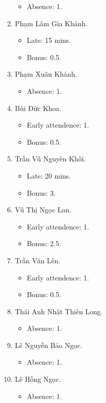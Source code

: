\documentclass{article}
\begin{document}
\begin{enumerate}
	\begin{itemize}
		\item Absence: 1.
	\end{itemize}
	\item {\sc Phạm Lâm Gia Khánh.}
	\begin{itemize}
		\item Late: 15 mins.
		\item Bonus: 0.5.
	\end{itemize}
	\item {\sc Phạm Xuân Khánh.}
	\begin{itemize}
		\item Absence: 1.
	\end{itemize}
	\item {\sc Bùi Đức Khoa.}
	\begin{itemize}
		\item Early attendence: 1.
		\item Bonus: 0.5.
	\end{itemize}
	\item {\sc Trần Vũ Nguyên Khôi.}
	\begin{itemize}
		\item Late: 20 mins.
		\item Bonus: 3.
	\end{itemize}
	\item {\sc Vũ Thị Ngọc Lan.}
	\begin{itemize}
		\item Early attendence: 1.
		\item Bonus: 2.5.
	\end{itemize}
	\item {\sc Trần Văn Lên.}
	\begin{itemize}
		\item Early attendence: 1.
		\item Bonus: 0.5.
	\end{itemize}
	\item {\sc Thái Anh Nhật Thiên Long.}
	\begin{itemize}
		\item Absence: 1.
	\end{itemize}
	\item {\sc Lê Nguyễn Bảo Ngọc.}
	\begin{itemize}
		\item Absence: 1.
	\end{itemize}
	\item {\sc Lê Hồng Ngọc.}
	\begin{itemize}
		\item Absence: 1.

\end{itemize}
\end{enumerate}
\end{document}
